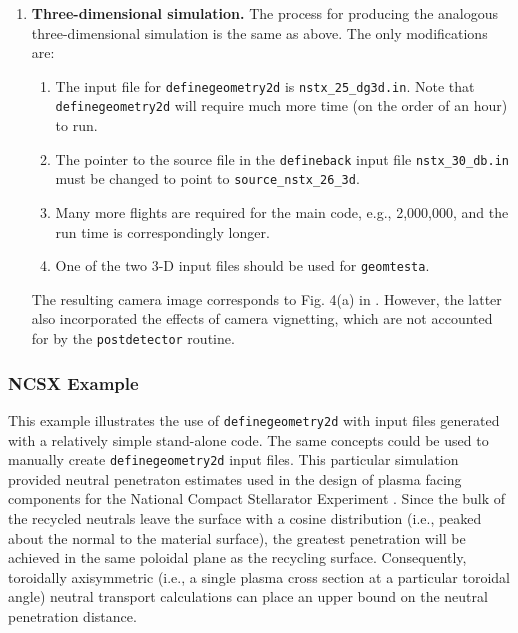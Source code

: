\documentclass[12pt]{report}
\begin{document}
\begin{enumerate}
The quantities in the other files require much more space to explain.  
The
interested reader can learn more in \cite{Stot2004} 
  \item {\bf Three-dimensional simulation.}
The process for producing the analogous three-dimensional simulation is
the same as above.  The only modifications are:
\begin{enumerate}
  \item The input file for {\tt definegeometry2d} is 
\verb+nstx_25_dg3d.in+.  Note
that {\tt definegeometry2d} will require much more time (on the order of an
hour) to run.
  \item The pointer to the source file in the {\tt defineback} input
file \verb+nstx_30_db.in+ must be changed to point to 
\verb+source_nstx_26_3d+.
  \item Many more flights are required for the main code, 
e.g., 2,000,000, and
the run time is correspondingly longer.
  \item One of the two 3-D input files should be used for
{\tt geomtesta}.
\end{enumerate}
The resulting camera image corresponds to Fig. 4(a) in 
\cite{Stot2007}.  However,
the latter also incorporated the effects of camera vignetting, which
are not accounted for by the {\tt postdetector} routine.
\end{enumerate}

\subsubsection{NCSX Example}

This example illustrates the use of {\tt definegeometry2d} with 
input files generated with a relatively simple
stand-alone code.  The same concepts could be used
to manually create {\tt definegeometry2d} input files.
This particular simulation provided
neutral penetraton estimates used 
in the design of plasma facing components for the
National Compact Stellarator Experiment \cite{Zarn2001}.  
Since the bulk of the recycled neutrals leave
the surface with a cosine distribution (i.e., peaked about the normal 
to the material surface), the
greatest penetration will be achieved in the same poloidal plane as 
the recycling surface.
Consequently, toroidally axisymmetric 
(i.e., a single plasma cross section at a 
particular toroidal angle) neutral transport calculations 
can place an upper bound
on the neutral penetration distance.
\end{document}
